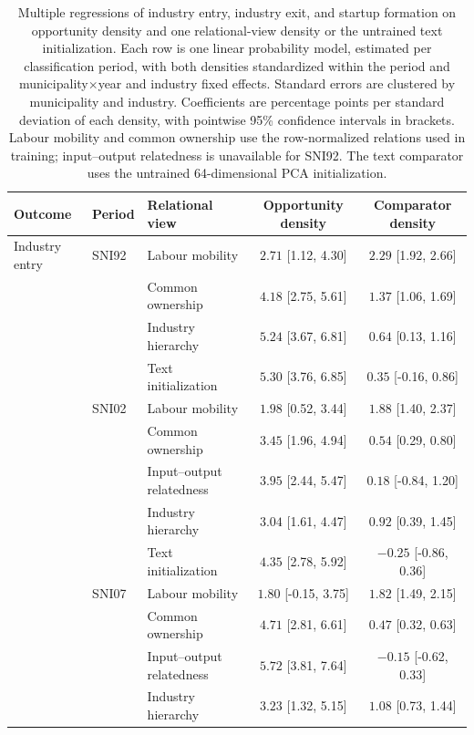 \documentclass[9pt,twoside]{pnas-new}
\begin{document}
\clearpage
\begin{table}[H]
\centering
\scriptsize
\setlength{\tabcolsep}{4pt}
\caption{Multiple regressions of industry entry, industry exit, and startup formation on opportunity density and one relational-view density or the untrained text initialization. Each row is one linear probability model, estimated per classification period, with both densities standardized within the period and municipality$\times$year and industry fixed effects. Standard errors are clustered by municipality and industry. Coefficients are percentage points per standard deviation of each density, with pointwise 95\% confidence intervals in brackets. Labour mobility and common ownership use the row-normalized relations used in training; input--output relatedness is unavailable for SNI92. The text comparator uses the untrained 64-dimensional PCA initialization.}
\label{tab:multiple_regression}
\begin{tabular}{lllcc}
\toprule
Outcome & Period & Relational view & Opportunity density & Comparator density \\
\midrule
Industry entry & SNI92 & Labour mobility & $2.71$ [1.12, 4.30] & $2.29$ [1.92, 2.66] \\
 &  & Common ownership & $4.18$ [2.75, 5.61] & $1.37$ [1.06, 1.69] \\
 &  & Industry hierarchy & $5.24$ [3.67, 6.81] & $0.64$ [0.13, 1.16] \\
 &  & Text initialization & $5.30$ [3.76, 6.85] & $0.35$ [-0.16, 0.86] \\
\addlinespace[2pt]
 & SNI02 & Labour mobility & $1.98$ [0.52, 3.44] & $1.88$ [1.40, 2.37] \\
 &  & Common ownership & $3.45$ [1.96, 4.94] & $0.54$ [0.29, 0.80] \\
 &  & Input--output relatedness & $3.95$ [2.44, 5.47] & $0.18$ [-0.84, 1.20] \\
 &  & Industry hierarchy & $3.04$ [1.61, 4.47] & $0.92$ [0.39, 1.45] \\
 &  & Text initialization & $4.35$ [2.78, 5.92] & $-0.25$ [-0.86, 0.36] \\
\addlinespace[2pt]
 & SNI07 & Labour mobility & $1.80$ [-0.15, 3.75] & $1.82$ [1.49, 2.15] \\
 &  & Common ownership & $4.71$ [2.81, 6.61] & $0.47$ [0.32, 0.63] \\
 &  & Input--output relatedness & $5.72$ [3.81, 7.64] & $-0.15$ [-0.62, 0.33] \\
 &  & Industry hierarchy & $3.23$ [1.32, 5.15] & $1.08$ [0.73, 1.44] \\

\end{tabular}
\end{table}
\end{document}
